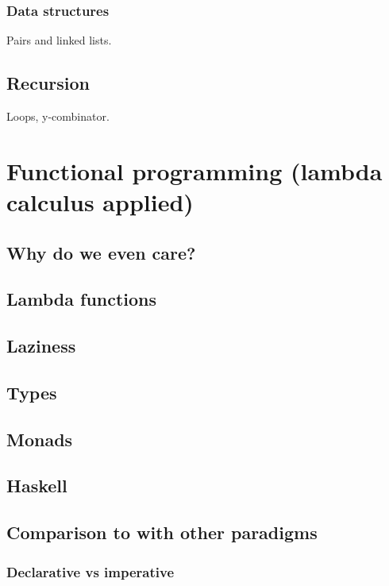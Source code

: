 \documentclass[11pt]{article}
\begin{document}
\subsubsection{Data structures}

Pairs and linked lists.

\subsection{Recursion}

Loops, y-combinator.

\section{Functional programming (lambda calculus applied)}

\subsection{Why do we even care?}

\subsection{Lambda functions}

\subsection{Laziness}

\subsection{Types}

\subsection{Monads}

\subsection{Haskell}

\subsection{Comparison to with other paradigms}

\subsubsection{Declarative vs imperative}
\end{document}
